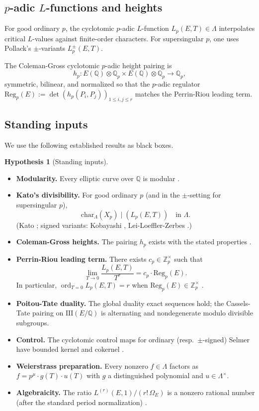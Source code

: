 \documentclass[12pt,reqno]{amsart}
\theoremstyle{definition}
\newtheorem{hypothesis}[theorem]{Hypothesis}
\theoremstyle{remark}
\newcommand{\Q}{\mathbb{Q}}
\newcommand{\Qp}{\mathbb{Q}_p}
\newcommand{\Zp}{\mathbb{Z}_p}
\newcommand{\Lam}{\Lambda}
\newcommand{\Sha}{\mathrm{III}}
\newcommand{\ShaE}{\Sha(E/\Q){}}
\newcommand{\chr}{\mathrm{char}}
\newcommand{\Reg}{\mathrm{Reg}}
\DeclareMathOperator{\ord}{ord}
\begin{document}
\subsection{$p$-adic $L$-functions and heights}
For good ordinary $p$, the cyclotomic $p$-adic $L$-function $L_p(E,T)\in\Lam$ interpolates critical $L$-values against finite-order characters.  For supersingular $p$, one uses Pollack's $\pm$-variants $L_p^\pm(E,T)$.

The Coleman-Gross cyclotomic $p$-adic height pairing is
\[
h_p: E(\Q)\otimes\Qp\times E(\Q)\otimes\Qp\longrightarrow\Qp,
\]
symmetric, bilinear, and normalized so that the $p$-adic regulator $\Reg_p(E):=\det(h_p(P_i,P_j))_{1\le i,j\le r}$ matches the Perrin-Riou leading term.

\subsection{Standing inputs}\label{subsec:blackbox}
We use the following established results as black boxes.

\begin{hypothesis}[Standing inputs]\label{hyp:standing}
\begin{itemize}
\item[\textup{(B1)}] \textbf{Modularity.} Every elliptic curve over $\Q$ is modular \textup{\cite{Wiles,TW,BCDT}}.
\item[\textup{(B2)}] \textbf{Kato's divisibility.} For good ordinary $p$ (and in the $\pm$-setting for supersingular $p$),
\[\chr_\Lam(X_p)\mid (L_p(E,T))\quad\text{in }\Lam.\]
\textup{(Kato \cite{Kato}; signed variants: Kobayashi \cite{Kob}, Lei-Loeffler-Zerbes \cite{LLZ}.)}
\item[\textup{(B3)}] \textbf{Coleman-Gross heights.} The pairing $h_p$ exists with the stated properties \textup{\cite{CG}}.
\item[\textup{(B4)}] \textbf{Perrin-Riou leading term.} There exists $c_p\in\Zp^\times$ such that
\begin{equation}\label{eq:PR-leading}
\lim_{T\to 0}\frac{L_p(E,T)}{T^r}=c_p\cdot\Reg_p(E).
\end{equation}
In particular, $\ord_{T=0}L_p(E,T)=r$ when $\Reg_p(E)\in\Zp^\times$ \textup{\cite{PR94,PR95}}.
\item[\textup{(B5)}] \textbf{Poitou-Tate duality.} The global duality exact sequences hold; the Cassels-Tate pairing on $\ShaE$ is alternating and nondegenerate modulo divisible subgroups.
\item[\textup{(B6)}] \textbf{Control.} The cyclotomic control maps for ordinary (resp.\ $\pm$-signed) Selmer have bounded kernel and cokernel \textup{\cite{Greenberg89}}.
\item[\textup{(B7)}] \textbf{Weierstrass preparation.} Every nonzero $f\in\Lam$ factors as $f=p^\mu\cdot g(T)\cdot u(T)$ with $g$ a distinguished polynomial and $u\in\Lam^\times$.
\item[\textup{(B8)}] \textbf{Algebraicity.} The ratio $L^{(r)}(E,1)/(r!\,\Omega_E)$ is a nonzero rational number (after the standard period normalization) \textup{\cite{Shimura77,Deligne79}}.
\end{itemize}
\end{hypothesis}
\end{document}

